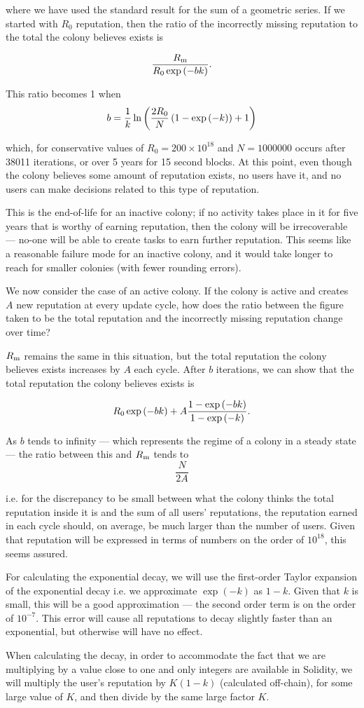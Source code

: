 \noindent where we have used the standard result for the sum of a geometric series. If we started with $R_0$ reputation, then the ratio of the incorrectly missing reputation to the total the colony believes exists is

$$\frac{R_{\rm m}}{R_0\exp\left(-bk\right)}.$$


This ratio becomes 1 when
$$ b = \frac{1}{k}\ln\left(\frac{2R_{\rm 0}}{N}\left(1-\exp\left(-k\right)\right) +1   \right)$$


\noindent which, for conservative values of $R_0 = 200\times10^{18}$ and $N=1000000$ occurs after 38011 iterations, or over 5 years for 15 second blocks. At this point, even though the colony believes some amount of reputation exists, no users have it, and no users can make decisions related to this type of reputation.

This is the end-of-life for an inactive colony; if no activity takes place in it for five years that is worthy of earning reputation, then the colony will be irrecoverable --- no-one will be able to create tasks to earn further reputation. This seems like a reasonable failure mode for an inactive colony, and it would take longer to reach for smaller colonies (with fewer rounding errors). 

We now consider the case of an active colony. If the colony is active and creates $A$ new reputation at every update cycle, how does the ratio between the figure taken to be the total reputation and the incorrectly missing reputation change over time?

$R_{\rm m}$ remains the same in this situation, but the total reputation the colony believes exists increases by $A$ each cycle. After $b$ iterations, we can show that the total reputation the colony believes exists is

$$R_{\rm 0}\exp\left(-bk\right) + A\frac{1-\exp\left(-bk\right)}{1-\exp\left(-k\right)}.$$


As $b$ tends to infinity --- which represents the regime of a colony in a steady state --- the ratio between this and $R_{\rm m}$ tends to 
$$\frac{N}{2A}$$

\noindent i.e. for the discrepancy to be small between what the colony thinks the total reputation inside it is and the sum of all users' reputations, the reputation earned in each cycle should, on average, be much larger than the number of users. Given that reputation will be expressed in terms of numbers on the order of $10^{18}$, this seems assured.

For calculating the exponential decay, we will use the first-order Taylor expansion of the exponential decay i.e. we approximate $\exp\left(-k\right)$ as $1-k$. Given that $k$ is small, this will be a good approximation --- the second order term is on the order of $10^{-7}$. This error will cause all reputations to decay slightly faster than an exponential, but otherwise will have no effect.

When calculating the decay, in order to accommodate the fact that we are multiplying by a value close to one and only integers are available in Solidity, we will multiply the user's reputation by $K(1-k)$ (calculated off-chain), for some large value of $K$, and then divide by the same large factor $K$.